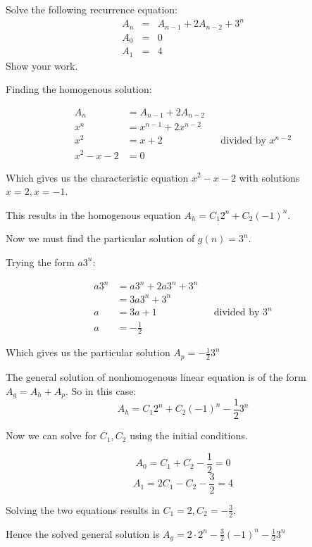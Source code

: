 
\begin{problem}
Solve the following recurrence equation:
%
\begin{eqnarray*}
        A_n &=& A_{n-1} + 2A_{n-2} + 3^n\\
        A_0 &=& 0 \\
        A_1 &=& 4
\end{eqnarray*}
%
Show your work.
\end{problem}

\begin{solution}

Finding the homogenous solution:

\begin{align*}
A_n &= A_{n-1} + 2A_{n-2} \\
x^n &= x^{n-1} + 2x^{n-2} \\
x^2 &= x + 2 && \text{divided by $x^{n-2}$} \\
x^2 - x - 2 &= 0
\end{align*}

Which gives us the characteristic equation $x^2 - x - 2$ with solutions $x=2, x=-1$.

This results in the homogenous equation $A_h = C_1 2^n + C_2 (-1)^n$.

Now we must find the particular solution of $g(n) = 3^n$.

Trying the form $a3^n$:

\begin{align*}
a3^n &= a3^n + 2a3^n +3^n \\
&= 3a3^n + 3^n \\
a &= 3a + 1 && \text{divided by $3^n$} \\ 
a &= -\frac{1}{2}
\end{align*}

Which gives us the particular solution $A_p = -\frac{1}{2}3^n$

The general solution of nonhomogenous linear equation is of the form $A_g = A_h + A_p$. So in this case:
$$A_h = C_1 2^n + C_2 (-1)^n - \frac{1}{2}3^n$$

Now we can solve for $C_1, C_2$ using the initial conditions.

$$A_0 = C_1 + C_2 - \frac{1}{2} = 0$$
$$A_1 = 2C_1 - C_2 - \frac{3}{2} = 4$$

Solving the two equations results in $C_1=2 , C_2=-\frac{3}{2}$.

Hence the solved general solution is $A_g = 2 \cdot 2^n - \frac{3}{2} (-1)^n - \frac{1}{2}3^n$

\end{solution}

\vskip 0.1in
